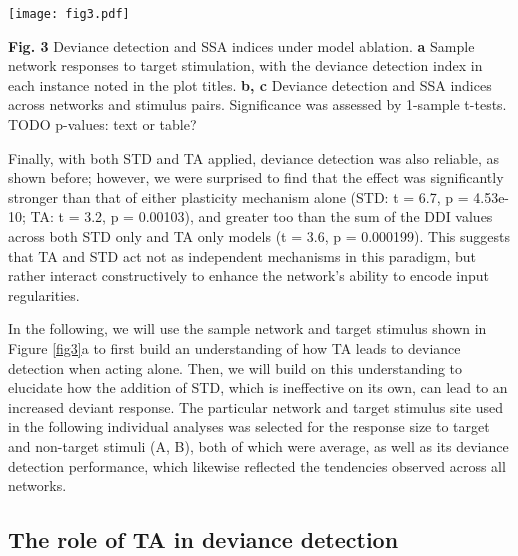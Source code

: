 \documentclass[pdflatex,referee,iicol,sn-basic]{sn-jnl}
\theoremstyle{thmstyleone}%
\theoremstyle{thmstyletwo}%
\theoremstyle{thmstylethree}%
\begin{document}
\begin{figure*}%
    \centering
    \texttt{[image: fig3.pdf]}
    \caption{Deviance detection and SSA indices under model ablation. \textbf{a} Sample network responses to target stimulation, with the deviance detection index in each instance noted in the plot titles. \textbf{b, c} Deviance detection and SSA indices across networks and stimulus pairs. Significance was assessed by 1-sample t-tests. TODO p-values: text or table?}
    \label{fig3}
\end{figure*}

\textbf{Fig. 3} Deviance detection and SSA indices under model ablation. \textbf{a} Sample network responses to target stimulation, with the deviance detection index in each instance noted in the plot titles. \textbf{b, c} Deviance detection and SSA indices across networks and stimulus pairs. Significance was assessed by 1-sample t-tests. TODO p-values: text or table?

Finally, with both STD and TA applied, deviance detection was also reliable, as shown before; however, we were surprised to find that the effect was significantly stronger than that of either plasticity mechanism alone (STD: t = 6.7, p = 4.53e-10; TA: t = 3.2, p = 0.00103), and greater too than the sum of the DDI values across both STD only and TA only models (t = 3.6, p = 0.000199). This suggests that TA and STD act not as independent mechanisms in this paradigm, but rather interact constructively to enhance the network's ability to encode input regularities.

In the following, we will use the sample network and target stimulus shown in Figure \ref{fig3}a to first build an understanding of how TA leads to deviance detection when acting alone. Then, we will build on this understanding to elucidate how the addition of STD, which is ineffective on its own, can lead to an increased deviant response. The particular network and target stimulus site used in the following individual analyses was selected for the response size to target and non-target stimuli (A, B), both of which were average, as well as its deviance detection performance, which likewise reflected the tendencies observed across all networks.

\subsection{The role of TA in deviance detection}\label{sec-ta}
\end{document}
